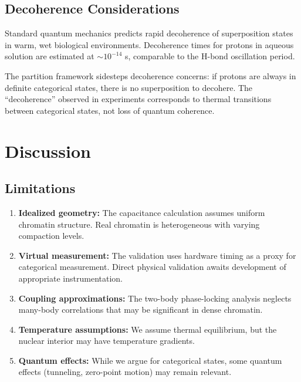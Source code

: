 \documentclass[twocolumn,10pt]{article}
\theoremstyle{remark}
\begin{document}
\subsection{Decoherence Considerations}

Standard quantum mechanics predicts rapid decoherence of superposition states in warm, wet biological environments. Decoherence times for protons in aqueous solution are estimated at $\sim$$10^{-14}$ s, comparable to the H-bond oscillation period.

The partition framework sidesteps decoherence concerns: if protons are always in definite categorical states, there is no superposition to decohere. The ``decoherence'' observed in experiments corresponds to thermal transitions between categorical states, not loss of quantum coherence.

\section{Discussion}

\subsection{Limitations}

\begin{enumerate}
\item \textbf{Idealized geometry:} The capacitance calculation assumes uniform chromatin structure. Real chromatin is heterogeneous with varying compaction levels.

\item \textbf{Virtual measurement:} The validation uses hardware timing as a proxy for categorical measurement. Direct physical validation awaits development of appropriate instrumentation.

\item \textbf{Coupling approximations:} The two-body phase-locking analysis neglects many-body correlations that may be significant in dense chromatin.

\item \textbf{Temperature assumptions:} We assume thermal equilibrium, but the nuclear interior may have temperature gradients.

\item \textbf{Quantum effects:} While we argue for categorical states, some quantum effects (tunneling, zero-point motion) may remain relevant.
\end{enumerate}
\end{document}
